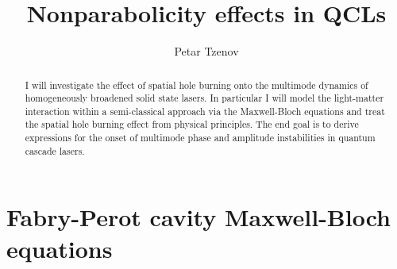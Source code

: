 \documentclass[preprint,secnumarabic,amssymb, nobibnotes, aip, prd]{revtex4-1}
\begin{document}
\title{Nonparabolicity effects in QCLs}%


\author{Petar Tzenov}%
\begin{abstract}
	I will investigate the effect of spatial hole burning onto the multimode dynamics of homogeneously broadened solid state lasers. In particular I will model the light-matter interaction within a semi-classical approach via the Maxwell-Bloch equations and treat the spatial hole burning effect from physical principles. The end goal is to derive expressions for the onset of multimode phase and amplitude instabilities in quantum cascade lasers. 
\end{abstract}
\maketitle


\section{Fabry-Perot cavity Maxwell-Bloch equations}
\end{document}
